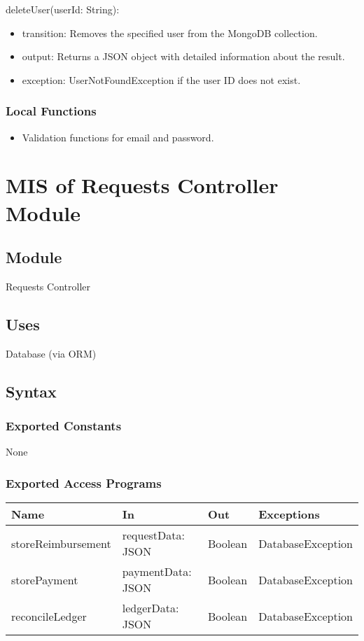 \documentclass[12pt, titlepage]{article}
\begin{document}
\noindent deleteUser(userId: String):
\begin{itemize}
  \item transition: Removes the specified user from the MongoDB collection.
  \item output: Returns a JSON object with detailed information about the result.
  \item exception: UserNotFoundException if the user ID does not exist.
\end{itemize}

\subsubsection{Local Functions}
\begin{itemize}
  \item Validation functions for email and password.
\end{itemize}

\section{MIS of Requests Controller Module} \label{RequestsController}

\subsection{Module}
Requests Controller

\subsection{Uses}
Database (via ORM)

\subsection{Syntax}

\subsubsection{Exported Constants}
None

\subsubsection{Exported Access Programs}
\begin{center}
\begin{tabular}{p{4cm} p{4cm} p{4cm} p{2cm}}
\hline
\textbf{Name} & \textbf{In} & \textbf{Out} & \textbf{Exceptions} \\
\hline
storeReimbursement & requestData: JSON & Boolean & DatabaseException \\
storePayment & paymentData: JSON & Boolean & DatabaseException \\
reconcileLedger & ledgerData: JSON & Boolean & DatabaseException \\
\hline
\end{tabular}
\end{center}
\end{document}
